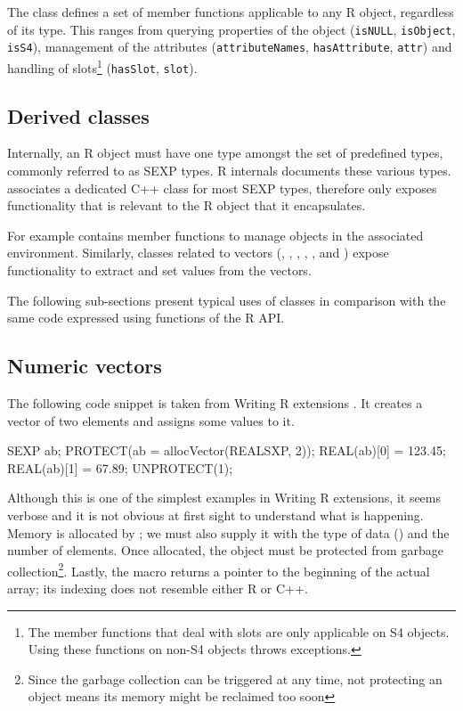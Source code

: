 The  class defines a set of member functions applicable
to any R object, regardless of its type. This ranges from 
querying properties of the object (\texttt{isNULL}, \texttt{isObject}, 
\texttt{isS4}), management of the attributes 
(\texttt{attributeNames}, \texttt{hasAttribute}, \texttt{attr}) and 
handling of slots\footnote{The member functions that deal with slots
are only applicable on S4 objects. Using these functions on 
non-S4 objects throws exceptions. } (\texttt{hasSlot}, \texttt{slot}).

\subsection{Derived classes}

Internally, an R object must have one type amongst the set of 
predefined types, commonly referred to as SEXP types. R internals
\citep{R:ints} documents these various types. 
 associates a dedicated C++ class for most SEXP types, 
therefore only exposes functionality that is relevant to the R object
that it encapsulates.

For example  contains 
member functions to manage objects in the associated environment. 
Similarly, classes related to vectors (, , 
, , , 
 and ) expose functionality
to extract and set values from the vectors.

The following sub-sections present typical uses of  classes in
comparison with the same code expressed using functions of the R API.

\subsection{Numeric vectors}

The following code snippet is taken from Writing R extensions
\citep{R:exts}. It creates a  vector of two elements 
and assigns some values to it. 

\begin{example}
SEXP ab;
PROTECT(ab = allocVector(REALSXP, 2));
REAL(ab)[0] = 123.45;
REAL(ab)[1] = 67.89;
UNPROTECT(1);
\end{example}

Although this is one of the simplest examples in Writing R extensions, 
it seems verbose and it is not obvious at first sight to understand what is happening.
Memory is allocated by ; we must also supply it with
the type of data () and the number of elements.  Once
allocated, the  object must be protected from garbage
collection\footnote{Since the garbage collection can be triggered at any time, not
protecting an object means its memory might be reclaimed too soon}. 
Lastly, the  macro returns a pointer to the
beginning of the actual array; its indexing does not resemble either R or
C++.

